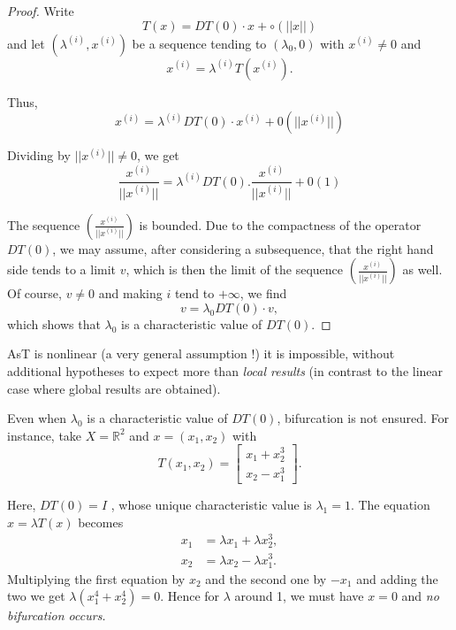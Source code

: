 \begin{proof}
Write
$$
T(x) = DT(0) \cdot x + \circ(||x||)
$$
and let $(\lambda^{(i)} , x^{(i)})$ be a sequence tending to $(\lambda_{0}, 0)$ with $x^{(i)} \neq 0$ and
$$
x^{(i)} = \lambda^{(i)} T(x^{(i)}).
$$

Thus,
$$
x^{(i)} = \lambda^{(i)} DT(0) \cdot x^{(i)} + 0(||x^{(i)}||)
$$

Dividing by $||x^{(i)}|| \neq 0$, we get
$$
\frac{x^{(i)}}{||x^{(i)}||} = \lambda^{(i)} DT(0). \frac{x^{(i)}}{||x^{(i)}||} + 0(1)
$$

The sequence $\left(\frac{x^{(i)}}{||x^{(i)}||}\right)$ is bounded. Due to the compactness of the operator $DT(0)$, we may assume, after considering a subsequence, that the right hand side tends to a limit $v$, which is then the limit of the sequence $\left(\frac{x^{(i)}}{||x^{(i)}||}\right)$ as well. Of course, $v \neq 0$ and making $i$ tend to $+ \infty$, we find
$$
v = \lambda_{0} DT(0) \cdot v,
$$
which shows that $\lambda_{0}$ is a characteristic value of $DT(0)$.
\end{proof}

\begin{remark}\label{chap1-rem1.1}
As\pageoriginale T is nonlinear (a very general assumption !) it is impossible, without additional hypotheses to expect more than {\em local results} (in contrast to the linear case where global results are obtained).
\end{remark}

\begin{remark}\label{chap1-rem1.2}
Even when $\lambda_{0}$ is a characteristic value of $DT(0)$, bifurcation is not ensured. For instance, take $X = \mathbb{R}^{2}$ and $x = (x_{1}, x_{2})$ with
\begin{equation*}
T(x_{1}, x_{2}) = 
\begin{bmatrix}
x_{1}  + x_{2}^{3}\\[4pt]
x_{2}  -  x_{1}^{3}
\end{bmatrix}.
\end{equation*}

Here, $DT(0) = I$ , whose unique characteristic value is $\lambda_{1} = 1$. The equation $x = \lambda T(x)$ becomes
\begin{align*}
x_{1} & = \lambda x_{1} + \lambda x_{2}^{3},\\
x_{2} & = \lambda x_{2} - \lambda x_{1}^{3}.
\end{align*}
Multiplying the first equation by $x_{2}$ and the second one by $-x_{1}$ and adding the two we get $\lambda(x_{1}^{4} + x_{2}^{4}) = 0$. Hence for $\lambda$ around 1, we must have $x = 0$ and {\em no bifurcation occurs.}
\end{remark}

